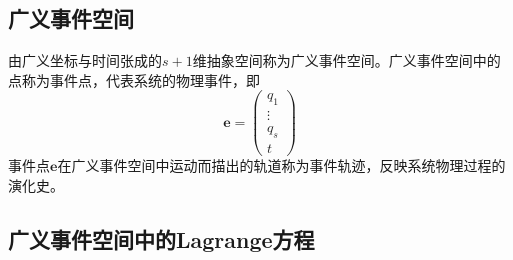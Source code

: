 \subsection{广义事件空间}

由广义坐标与时间张成的$s+1$维抽象空间称为{\heiti 广义事件空间}。广义事件空间中的点称为{\heiti 事件点}，代表系统的物理事件，即
\begin{equation}
	\boldsymbol{e} = \begin{pmatrix}
		q_1 \\ \vdots \\ q_s \\ t
	\end{pmatrix}
\end{equation}
事件点$\boldsymbol{e}$在广义事件空间中运动而描出的轨道称为{\heiti 事件轨迹}，反映系统物理过程的演化史。

\subsection{广义事件空间中的Lagrange方程}

